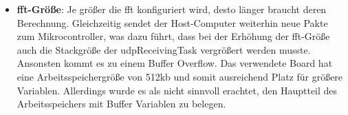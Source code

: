 \documentclass[../EDF Master Thesis.tex]{subfiles}
\begin{document}
\begin{itemize}
        \item \textbf{\ac{fft}-Größe}: Je größer die \ac{fft} konfiguriert wird, desto länger braucht deren Berechnung.
            Gleichzeitig sendet der Host-Computer weiterhin neue Pakte zum Mikrocontroller, was dazu führt, dass bei der Erhöhung der \ac{fft}-Größe auch die Stackgröße der udpReceivingTask vergrößert werden musste.
            Ansonsten kommt es zu einem Buffer Overflow.
            Das verwendete Board hat eine Arbeitsspeichergröße von 512kb und somit ausreichend Platz für größere Variablen.
            Allerdings wurde es als nicht sinnvoll erachtet, den Hauptteil des Arbeitsspeichers mit Buffer Variablen zu belegen.
    \end{itemize}
\end{document}
